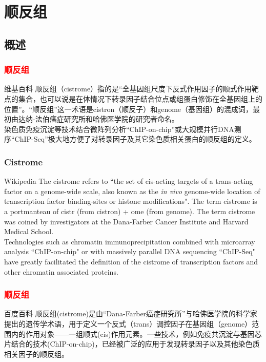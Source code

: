 \section{顺反组}
\subsection{概述}
\begin{frame}
  \frametitle{\textcolor{red}{顺反组}}
  \begin{block}{维基百科}
顺反组（cistrome）指的是“全基因组尺度下反式作用因子的顺式作用靶点的集合，也可以说是在体情况下转录因子结合位点或组蛋白修饰在全基因组上的位置”。“顺反组”这一术语是cistron（顺反子）和genome（基因组）的混成词，最初由达纳-法伯癌症研究所和哈佛医学院的研究者命名。\\
\vspace{0.3em}
    染色质免疫沉淀等技术结合微阵列分析“ChIP-on-chip”或大规模并行DNA测序“ChIP-Seq”极大地方便了对转录因子及其它染色质相关蛋白的顺反组的定义。
  \end{block}
\end{frame}

\begin{frame}
  \frametitle{Cistrome}
  \begin{block}{Wikipedia}
    The cistrome refers to ``the set of cis-acting targets of a trans-acting factor on a genome-wide scale, also known as the \textit{in vivo} genome-wide location of transcription factor binding-sites or histone modifications". The term cistrome is a portmanteau of cistr (from cistron) + ome (from genome). The term cistrome was coined by investigators at the Dana-Farber Cancer Institute and Harvard Medical School.\\
\vspace{0.3em}
    Technologies such as chromatin immunoprecipitation combined with microarray analysis ``ChIP-on-chip" or with massively parallel DNA sequencing ``ChIP-Seq" have greatly facilitated the definition of the cistrome of transcription factors and other chromatin associated proteins.
  \end{block}
\end{frame}

\begin{frame}
  \frametitle{\textcolor{red}{顺反组}}
  \begin{block}{百度百科}
    顺反组(cistrome)是由“Dana-Farber癌症研究所”与哈佛医学院的科学家提出的遗传学术语，用于定义一个反式（trans）调控因子在基因组（genome）范围内的作用对象——一组顺式(cis)作用元素。一些技术，例如免疫共沉淀与基因芯片结合的技术(ChIP-on-chip)，已经被广泛的应用于发现转录因子以及其他染色质相关因子的顺反组。
  \end{block}
\end{frame}

